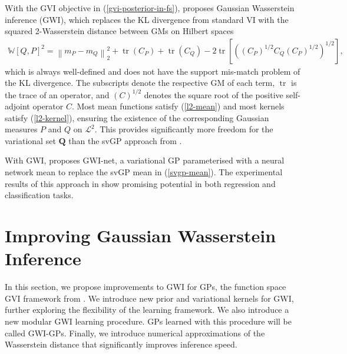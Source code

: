 \documentclass{article}
\newcommand{\tr}{\operatorname{tr}}
\numberwithin{equation}{section}
\begin{document}
With the GVI objective in (\ref{gvi-posterior-in-fs}), \cite{wild2022generalized} proposes Gaussian Wasserstein inference (GWI), which replaces the KL divergence from standard VI with the squared 2-Wasserstein distance between GMs on Hilbert spaces 
\begin{align}
    \mathbb{W}\left[Q, P\right]^2 = \left\|m_P - m_Q\right\|_2^2 + \tr\left(C_P\right) + \tr\left(C_Q\right) - 2 \tr \left[\left(\left(C_P\right)^{1/2} C_Q \left(C_P\right)^{1/2} \right)^{1/2}\right],
    \label{wasserstein-distance}
\end{align}
which is always well-defined and does not have the support mis-match problem of the KL divergence.
The subscripts denote the respective GM of each term, $\tr$ is the trace of an operator, and $(C)^{1/2}$ denotes the square root of the positive self-adjoint operator $C$.
Most mean functions satisfy (\ref{l2-mean}) and most kernels satisfy (\ref{l2-kernel}), ensuring the existence of the corresponding Gaussian measures $P$ and $Q$ on $\mathcal{L}^2$.
This provides significantly more freedom for the variational set $\boldsymbol{Q}$ than the svGP approach from \cite{titsias2009variational}.

With GWI, \cite{wild2022generalized} proposes GWI-net, a variational GP parameterised with a neural network mean to replace the svGP mean in (\ref{svgp-mean}).
The experimental results of this approach in \cite{wild2022generalized} show promising potential in both regression and classification tasks.

\newpage

\section{Improving Gaussian Wasserstein Inference}\label{section:improving-gwi}
In this section, we propose improvements to GWI for GPs, the function space GVI framework from \cite{wild2022generalized}.
We introduce new prior and variational kernels for GWI, further exploring the flexibility of the learning framework.
We also introduce a new modular GWI learning procedure.
GPs learned with this procedure will be called GWI-GPs.
Finally, we introduce numerical approximations of the Wasserstein distance that significantly improves inference speed.
\end{document}

